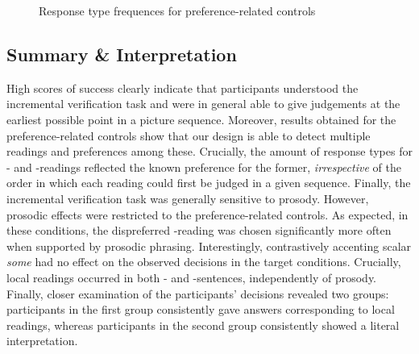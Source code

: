 \documentclass[fleqn,reqno,10pt,draft]{article}
\newcommand{\as}{\acro{as}}
\renewcommand{\es}{\acro{es}}
\newcommand{\lc}{\acro{lc}}
\newcommand{\ec}{\acro{ec}}
\begin{document}
\begin{figure}[t]
{
}
  \caption{Response type frequences for preference-related controls}
  \label{fig:response-type-freque-TRF}
\end{figure}


\subsection{Summary \& Interpretation}
\label{sec:interpretation}


High scores of success clearly indicate that participants understood 
the incremental verification task and were in general able to give 
judgements at the earliest possible point in a picture sequence. 
Moreover, results obtained for the preference-related controls  
show that our design is able to detect multiple readings and preferences 
among these. Crucially, the amount of response types for \lc- and \ec-readings 
reflected the known preference for the former, \emph{irrespective} of the 
order in which each reading could first be judged in a given sequence.
Finally, the incremental verification task was generally sensitive
to prosody. However, prosodic effects were restricted to the preference-related 
controls. As expected, in these conditions, the dispreferred \ec-reading was chosen 
significantly more often when supported by prosodic phrasing. Interestingly, 
contrastively accenting scalar \emph{some} had no effect on the observed 
decisions in the target conditions. Crucially, local readings occurred in both
\as- and \es-sentences, independently of prosody. Finally, closer examination of 
the participants' decisions revealed two groups: participants in the first
group consistently gave answers corresponding to local readings, whereas participants
in the second group consistently showed a literal interpretation.  
\end{document}
